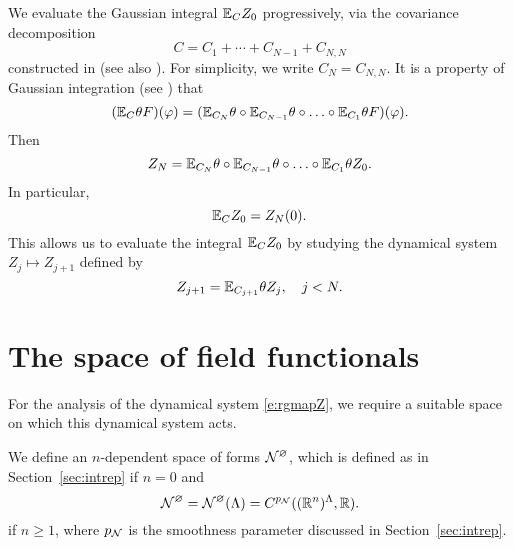 We evaluate the Gaussian integral $\mathbb{E}_C Z_0$ progressively, via
the covariance decomposition
\begin{equation}
\label{e:NCj}
C = C_1 + \cdots + C_{N-1} + C_{N,N}
\end{equation}
constructed in \cite{Baue13a} (see also \cite{BGM04}). For simplicity, we write $C_N = C_{N,N}$.
It is a property of Gaussian integration (see \cite{BS-rg-norm}) that
\begin{equation}
	(\mathbb{E}_C \theta F)(\varphi)
	=
	(\mathbb{E}_{C_N}\theta \circ \mathbb{E}_{C_{N-1}}\theta \circ \ldots \circ \mathbb{E}_{C_1}\theta F)
	(\varphi).
\end{equation}
Then
\begin{equation}
Z_N
=
\mathbb{E}_{C_N}\theta \circ \mathbb{E}_{C_{N-1}}\theta \circ \ldots \circ \mathbb{E}_{C_1}\theta Z_0.
\end{equation}
In particular,
\begin{equation}
\label{e:exp-conv}
\mathbb{E}_C Z_0 = Z_N(0).
\end{equation}
This allows us to evaluate the integral $\mathbb{E}_C Z_0$ by studying the
dynamical system $Z_j \mapsto Z_{j+1}$ defined by
\begin{equation}
\label{e:rgmapZ}
Z_{j+1} = \mathbb{E}_{C_{j+1}} \theta Z_j, \quad j < N.
\end{equation}


\section{The space of field functionals}

For the analysis of the dynamical system \eqref{e:rgmapZ}, we require a suitable
space on which this dynamical system acts.

We define an $n$-dependent space of forms
$\mathcal{N}^\varnothing$, which is defined as in Section~\ref{sec:intrep} if $n = 0$ and
\begin{equation}
\label{e:Ncaldef}
\mathcal{N}^\varnothing
	= \mathcal{N}^\varnothing(\Lambda)
	= C^{p_{\mathcal{N}}}(({\mathbb R}^n)^\Lambda,{\mathbb R}).
\end{equation}
if $n \ge 1$, where $p_{\mathcal{N}}$ is the smoothness parameter discussed in Section~\ref{sec:intrep}.


